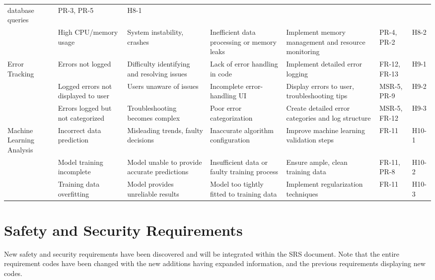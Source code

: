 \documentclass{article}
\begin{document}
\begin{landscape}
\begin{longtable}{|p{2.5cm}|p{4cm}|p{4cm}|p{4cm}|p{4cm}|p{1.25cm}|p{1cm}|}
        database queries & PR-3, PR-5 & H8-1 \\
        \cline{2-7}
        \texttt{} & High CPU/memory usage & System instability, crashes &
        Inefficient data processing or memory leaks & Implement memory
        management and resource monitoring & PR-4, PR-2 & H8-2 \\
        \cline{1-7}
        Error Tracking & Errors not logged & Difficulty identifying and
        resolving issues & Lack of error handling in code & Implement detailed
        error logging & FR-12, FR-13 & H9-1 \\
        \cline{2-7}
        \texttt{} & Logged errors not displayed to user & Users unaware of
        issues & Incomplete error-handling UI & Display errors to user,
        troubleshooting tips & MSR-5, PR-9 & H9-2 \\
        \cline{2-7}
        \texttt{} & Errors logged but not categorized & Troubleshooting becomes
        complex & Poor error categorization & Create detailed error categories
        and log structure & MSR-5, FR-12 & H9-3 \\
        \cline{1-7}
        Machine Learning Analysis & Incorrect data prediction & Misleading
        trends, faulty decisions & Inaccurate algorithm configuration & Improve
        machine learning validation steps & FR-11 & H10-1 \\
        \cline{2-7}
        \texttt{} & Model training incomplete & Model unable to provide accurate
        predictions & Insufficient data or faulty training process & Ensure
        ample, clean training data & FR-11, PR-8 & H10-2 \\
        \cline{2-7}
        \texttt{} & Training data overfitting & Model provides unreliable
        results & Model too tightly fitted to training data & Implement
        regularization techniques & FR-11 & H10-3 \\
        
    \end{longtable}
\end{landscape}

\restoregeometry

\section{Safety and Security Requirements}
New safety and security requirements have been discovered and will be integrated
within the SRS document. Note that the entire requirement codes have been
changed with the new additions having expanded information, and the previous
requirements displaying new codes.
\end{document}
